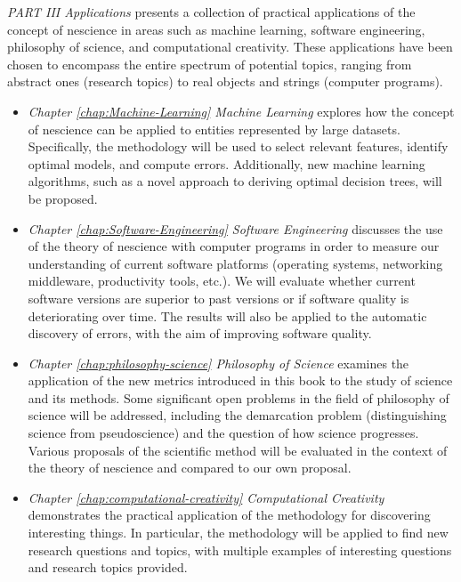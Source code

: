 \bigskip

\emph{PART III Applications} presents a collection of practical applications of the concept of nescience in areas such as machine learning, software engineering, philosophy of science, and computational creativity. These applications have been chosen to encompass the entire spectrum of potential topics, ranging from abstract ones (research topics) to real objects and strings (computer programs).

\begin{itemize}

\item \emph{Chapter \ref{chap:Machine-Learning} Machine Learning} explores how the concept of nescience can be applied to entities represented by large datasets. Specifically, the methodology will be used to select relevant features, identify optimal models, and compute errors. Additionally, new machine learning algorithms, such as a novel approach to deriving optimal decision trees, will be proposed.

\item \emph{Chapter \ref{chap:Software-Engineering} Software Engineering} discusses the use of the theory of nescience with computer programs in order to measure our understanding of current software platforms (operating systems, networking middleware, productivity tools, etc.). We will evaluate whether current software versions are superior to past versions or if software quality is deteriorating over time. The results will also be applied to the automatic discovery of errors, with the aim of improving software quality.

\item \emph{Chapter \ref{chap:philosophy-science} Philosophy of Science} examines the application of the new metrics introduced in this book to the study of science and its methods. Some significant open problems in the field of philosophy of science will be addressed, including the demarcation problem (distinguishing science from pseudoscience) and the question of how science progresses. Various proposals of the scientific method will be evaluated in the context of the theory of nescience and compared to our own proposal.

\item \emph{Chapter \ref{chap:computational-creativity} Computational Creativity} demonstrates the practical application of the methodology for discovering interesting things. In particular, the methodology will be applied to find new research questions and topics, with multiple examples of interesting questions and research topics provided.

\end{itemize}

